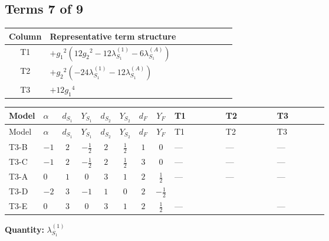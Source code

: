 \documentclass[8pt]{article}
\begin{document}
\begin{landscape}
\subsection*{Terms 7 of 9}
\begin{center}
\begin{tabular}{@{}c >{\raggedright\arraybackslash}p{0.82\linewidth}@{}}
\toprule
Column & Representative term structure \\
\midrule
T1 & \(\displaystyle +{g_1}^2 \left(12 {g_2}^2-12 {\lambda_{S_1}^{(1)}}-6 {\lambda_{S_1}^{(A)}}\right)\) \\
\midrule
T2 & \(\displaystyle +{g_2}^2 (-24 {\lambda_{S_1}^{(1)}}-12 {\lambda_{S_1}^{(A)}})\) \\
\midrule
T3 & \(\displaystyle +12 {g_1}^4\) \\
\midrule
\bottomrule
\end{tabular}
\end{center}
\smallskip
\tiny
\begin{longtable}{@{}llcccccc >{\raggedright\arraybackslash}p{0.21\linewidth} >{\raggedright\arraybackslash}p{0.21\linewidth} >{\raggedright\arraybackslash}p{0.21\linewidth}@{}}
\toprule
Model & $\alpha$ & $d_{S_1}$ & $Y_{S_1}$ & $d_{S_2}$ & $Y_{S_2}$ & $d_F$ & $Y_F$ & T1 & T2 & T3 \\
\midrule
\endfirsthead
\toprule
Model & $\alpha$ & $d_{S_1}$ & $Y_{S_1}$ & $d_{S_2}$ & $Y_{S_2}$ & $d_F$ & $Y_F$ & T1 & T2 & T3 \\
\midrule
\endhead
T3-B & $-1$ & $2$ & $-\frac{1}{2}$ & $2$ & $\frac{1}{2}$ & $1$ & $0$ & --- & --- & --- \\
\midrule
T3-C & $-1$ & $2$ & $-\frac{1}{2}$ & $2$ & $\frac{1}{2}$ & $3$ & $0$ & --- & --- & --- \\
\midrule
T3-A & $0$ & $1$ & $0$ & $3$ & $1$ & $2$ & $\frac{1}{2}$ & --- & --- & --- \\
\midrule
T3-D & $-2$ & $3$ & $-1$ & $1$ & $0$ & $2$ & $-\frac{1}{2}$ & \scriptsize\adjustbox{max width=\linewidth}{$\begin{gathered} +{g_1}^2 \left(12 {g_2}^2-12 {\lambda_{S_1}^{(1)}}-6 {\lambda_{S_1}^{(A)}}\right)\end{gathered}$} & \scriptsize\adjustbox{max width=\linewidth}{$\begin{gathered} +{g_2}^2 (-24 {\lambda_{S_1}^{(1)}}-12 {\lambda_{S_1}^{(A)}})\end{gathered}$} & \scriptsize\adjustbox{max width=\linewidth}{$\begin{gathered} +12 {g_1}^4\end{gathered}$} \\
\midrule
T3-E & $0$ & $3$ & $0$ & $3$ & $1$ & $2$ & $\frac{1}{2}$ & --- & \scriptsize\adjustbox{max width=\linewidth}{$\begin{gathered} +{g_2}^2 (-24 {\lambda_{S_1}^{(1)}}-12 {\lambda_{S_1}^{(A)}})\end{gathered}$} & --- \\
\midrule
\bottomrule
\end{longtable}
\clearpage
\noindent\textbf{Quantity: }$\lambda_{S_1}^{(1)}$\par\smallskip

\end{landscape}
\end{document}
